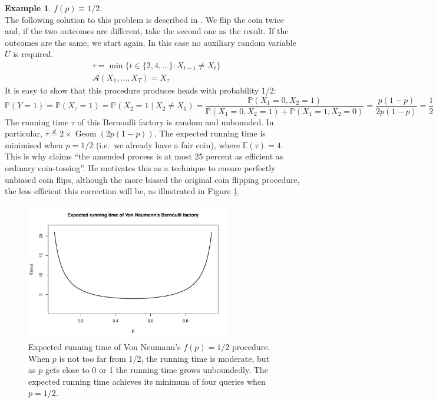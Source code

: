 \documentclass{article}
\theoremstyle{definition}
\newtheorem{example}{Example}
\newcommand{\PR}{\mathbb{P}}
\newcommand{\E}{\mathbb{E}}
\newcommand{\eqdist}{\overset{d}{=}}
\newcommand{\Geom}{\operatorname{Geom}}
\newcommand{\A}{\mathcal{A}}
\begin{document}
\begin{example}\label{ex:bf_half}
$f(p) \equiv 1/2$.\\
The following solution to this problem is described in \citet{vonneumann1951}.
We flip the coin twice and, if the two outcomes are different, take the second one as the result. If the outcomes are the same, we start again.
In this case no auxiliary random variable $U$ is required.
\begin{align*}
& \tau = \min\{ t \in \{2,4,\dots\} : X_{t-1} \neq X_t \} \\
& \A(X_1,\dots,X_T) = X_\tau
\end{align*}
It is easy to show that this procedure produces heads with probability 1/2:
\begin{equation*}
\PR(Y=1) = \PR(X_\tau = 1) = \PR(X_2 = 1 \mid X_2\neq X_1) = \frac{\PR(X_1 = 0, X_2 = 1)}{\PR(X_1 = 0, X_2 = 1) + \PR(X_1 = 1, X_2 = 0)} = \frac{p(1-p)}{2p(1-p)} = \frac{1}{2}
\end{equation*}
The running time $\tau$ of this Bernoulli factory is random and unbounded. In particular, 
$\tau \eqdist 2\times\Geom(2p(1-p))$. The expected running time is minimised when $p=1/2$ (i.e.\ we already have a fair coin), where $\E(\tau)=4$. This is why \citet{vonneumann1951} claims ``the amended process is at most 25 percent as efficient as ordinary coin-tossing''. He motivates this as a technique to ensure perfectly unbiased coin flips, although the more biased the original coin flipping procedure, the less efficient this correction will be, as illustrated in Figure \ref{fig:vonneumann_runtime}.
\begin{figure}
\centering
\includegraphics[width=0.8\textwidth]{vonneu_runtime.pdf}
\caption{Expected running time of Von Neumann's $f(p)=1/2$ procedure. When $p$ is not too far from 1/2, the running time is moderate, but as $p$ gets close to 0 or 1 the running time grows unboundedly. The expected running time achieves its minimum of four queries when $p=1/2$.}\label{fig:vonneumann_runtime}
\end{figure}
\end{example}
\end{document}
